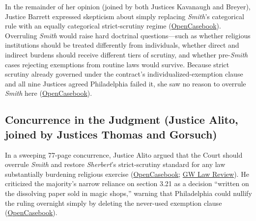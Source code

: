 \documentclass[12pt]{article}
\begin{document}
In the remainder of her opinion (joined by both Justices Kavanaugh and Breyer), Justice Barrett expressed skepticism about simply replacing \textit{Smith}'s categorical rule with an equally categorical strict-scrutiny regime (\href{https://opencasebook.org/casebooks/4501-constitutional-law/resources/12.9-fulton-v-city-of-philadelphia-2020/}{OpenCasebook}). Overruling \textit{Smith} would raise hard doctrinal questions---such as whether religious institutions should be treated differently from individuals, whether direct and indirect burdens should receive different tiers of scrutiny, and whether pre-\textit{Smith} cases rejecting exemptions from routine laws would survive. Because strict scrutiny already governed under the contract's individualized-exemption clause and all nine Justices agreed Philadelphia failed it, she saw no reason to overrule \textit{Smith} here (\href{https://opencasebook.org/casebooks/4501-constitutional-law/resources/12.9-fulton-v-city-of-philadelphia-2020/}{OpenCasebook}).

\subsection{Concurrence in the Judgment (Justice Alito, joined by Justices Thomas and Gorsuch)}
In a sweeping 77-page concurrence, Justice Alito argued that the Court should overrule \textit{Smith} and restore \textit{Sherbert}'s strict-scrutiny standard for any law substantially burdening religious exercise (\href{https://opencasebook.org/casebooks/4501-constitutional-law/resources/12.9-fulton-v-city-of-philadelphia-2020/}{OpenCasebook}; \href{https://www.gwlr.org/two-surprises-in-fulton-v-city-of-philadelphia/}{GW Law Review}). He criticized the majority's narrow reliance on section 3.21 as a decision ``written on the dissolving paper sold in magic shops,'' warning that Philadelphia could nullify the ruling overnight simply by deleting the never-used exemption clause (\href{https://opencasebook.org/casebooks/4501-constitutional-law/resources/12.9-fulton-v-city-of-philadelphia-2020/}{OpenCasebook}).
\end{document}
